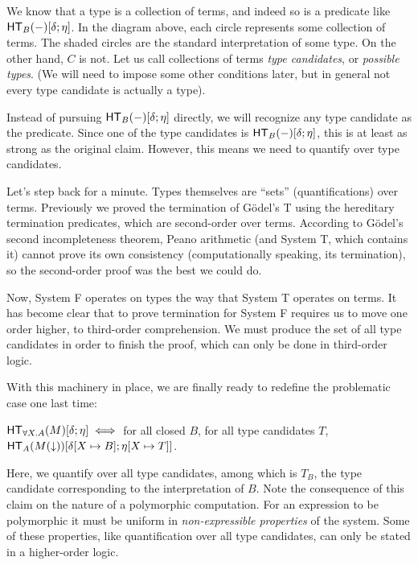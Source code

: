 \documentclass{article}
\begin{document}

We know that a type is a collection of terms, and indeed so is a predicate like
$\mathsf{HT}_{B}(-)[\delta;\eta]$. In the diagram above, each circle represents some collection of terms.
The shaded circles are the standard interpretation of some type. On the other hand, $C$ is not.
Let us call collections of terms \emph{type candidates}, or \emph{possible types}. (We will need
to impose some other conditions later, but in general not every type candidate is actually a type).

Instead of pursuing $\mathsf{HT}_{B}(-)[\delta;\eta]$ directly, we will recognize any type candidate
as the predicate. Since one of the type candidates is $\mathsf{HT}_{B}(-)[\delta;\eta]$, this is at
least as strong as the original claim. However, this means we need to quantify over type candidates.


Let's step back for a minute. Types themselves are ``sets'' (quantifications) over terms.
Previously we proved the termination of G\"odel's T using the hereditary termination predicates,
which are second-order over terms. According to G\"odel's second incompleteness theorem, Peano
arithmetic (and System T, which contains it) cannot prove its own consistency (computationally
speaking, its termination), so the second-order proof was the best we could do.

Now, System F operates on types the way that System T operates on terms. It has become clear that
to prove termination for System F requires us to move one order higher, to third-order comprehension.
We must produce the set of all type candidates in order to finish the proof, which can only be
done in third-order logic.

With this machinery in place, we are finally ready to redefine the problematic case one last time:

$\mathsf{HT}_{\forall X. A}(M)[\delta;\eta] \iff $ for all closed $B$, for all type candidates $T$,
$\mathsf{HT}_{A}(M(\downarrow))[\delta[X \mapsto B];\eta[X \mapsto T]]$.

Here, we quantify over all type candidates, among which is $T_B$, the type candidate corresponding
to the interpretation of $B$. Note the consequence of this claim on the nature of a polymorphic
computation. For an expression to be polymorphic it must be uniform in \emph{non-expressible properties}
of the system. Some of these properties, like quantification over all type candidates, can only
be stated in a higher-order logic.
\end{document}
